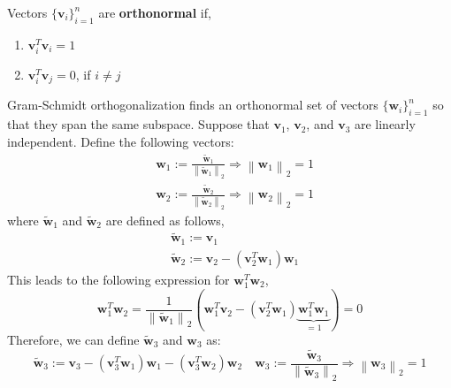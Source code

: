 \NewLine

\begin{defn}[Orthonormal]
	Vectors $\{\mathbf{v}_i\}_{i=1}^n$ are \textbf{orthonormal} if,
	\begin{enumerate}
		\item $\boldsymbol{v}_i^T \boldsymbol{v}_i=1$
		\item $\boldsymbol{v}_i^T \boldsymbol{v}_j=0$, if $i \neq j$
	\end{enumerate}
\end{defn}

\NewLine

Gram-Schmidt orthogonalization finds an orthonormal set of vectors $\{\mathbf{w}_i\}_{i=1}^n$ so that they span the same subspace. Suppose that $\mathbf{v}_1$, $\mathbf{v}_2$, and $\mathbf{v}_3$ are linearly independent. Define the following vectors:
\[
\begin{aligned}
&\boldsymbol{w}_1:=\frac{\tilde{\boldsymbol{w}}_1}{\left\|\tilde{\boldsymbol{w}}_1\right\|_2} \Rightarrow\left\|\boldsymbol{w}_1\right\|_2=1 \\
&\boldsymbol{w}_2:=\frac{\tilde{\boldsymbol{w}}_2}{\left\|\tilde{\boldsymbol{w}}_2\right\|_2} \Rightarrow\left\|\boldsymbol{w}_2\right\|_2=1
\end{aligned}
\]
where $\tilde{\boldsymbol{w}}_1$ and $\tilde{\boldsymbol{w}}_2$ are defined as follows,
\[\begin{aligned}
&\tilde{\boldsymbol{w}}_1:=\boldsymbol{v}_1 \\
&\tilde{\boldsymbol{w}}_2:=\boldsymbol{v}_2-\left(\boldsymbol{v}_2^T \boldsymbol{w}_1\right) \boldsymbol{w}_1
\end{aligned}\]
This leads to the following expression for $\mathbf{w}_1^T \mathbf{w}_2$,
\[\boldsymbol{w}_1^T \boldsymbol{w}_2=\frac{1}{\left\|\tilde{\boldsymbol{w}}_1\right\|_2}(\boldsymbol{w}_1^T \boldsymbol{v}_2-\left(\boldsymbol{v}_2^T \boldsymbol{w}_1\right) \underbrace{\boldsymbol{w}_1^T \boldsymbol{w}_1}_{=1})=0\] 
Therefore, we can define $\tilde{\boldsymbol{w}}_3$ and $\mathbf{w}_3$ as:
\[\tilde{\boldsymbol{w}}_3:=\boldsymbol{v}_3-\left(\boldsymbol{v}_3^T \boldsymbol{w}_1\right) \boldsymbol{w}_1-\left(\boldsymbol{v}_3^T \boldsymbol{w}_2\right) \boldsymbol{w}_2 \quad \boldsymbol{w}_3:=\frac{\tilde{\mathbf{w}}_3}{\left\|\tilde{\boldsymbol{w}}_3\right\|_2} \Rightarrow\left\|\boldsymbol{w}_3\right\|_2=1\]